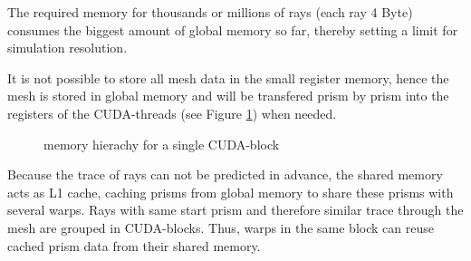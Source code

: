 The required memory for thousands or millions of rays (each ray 4 Byte)
consumes the biggest amount of global memory so far, thereby setting 
a limit for simulation resolution. 

It is not possible to store all mesh data in the small register
memory, hence the mesh is stored in global memory and will
be transfered prism by prism into the registers of the
CUDA-threads (see Figure \ref{graphic:memory_hierarchy}) when needed.

\begin{figure}[H]
  \centerline
  {}
  \caption{memory hierachy for a single CUDA-block}
  \label{graphic:memory_hierarchy}
\end{figure}

Because the trace of rays can not be predicted in advance,
the shared memory acts as L1 cache, caching
prisms from global memory to share these prisms 
with several warps.
Rays with same start prism and therefore similar trace through 
the mesh are grouped in CUDA-blocks. Thus, warps in the same block can 
reuse cached prism data from their shared memory.

